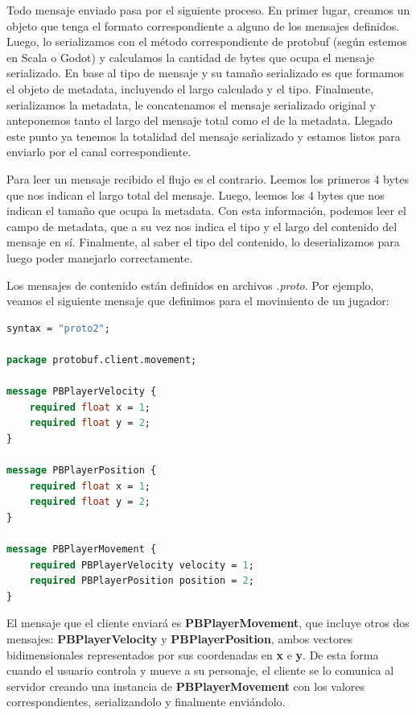 \newpage

Todo mensaje enviado pasa por el siguiente proceso. En primer lugar, creamos un objeto que tenga el formato correspondiente a alguno de los
mensajes definidos. Luego, lo serializamos con el método correspondiente de protobuf (según estemos en Scala o Godot) y
calculamos la cantidad de bytes que ocupa el mensaje serializado. En base al tipo de mensaje y su tamaño serializado es que formamos el objeto de metadata, incluyendo el largo calculado y el tipo.
Finalmente, serializamos la metadata, le concatenamos el mensaje serializado original y anteponemos tanto el largo del mensaje total como el de la metadata.
Llegado este punto ya tenemos la totalidad del mensaje serializado y estamos listos para enviarlo por el canal correspondiente.

Para leer un mensaje recibido el flujo es el contrario. Leemos los primeros 4 bytes que nos indican el largo
total del mensaje. Luego, leemos los 4 bytes que nos indican el tamaño que ocupa la metadata. Con esta información, podemos leer
el campo de metadata, que a su vez nos indica el tipo y el largo del contenido del mensaje en sí. Finalmente, al saber el tipo del contenido, lo
deserializamos para luego poder manejarlo correctamente.

Los mensajes de contenido están definidos en archivos \textit{.proto}. Por ejemplo, veamos el siguiente
mensaje que definimos para el movimiento de un jugador:

\begin{lstlisting}[language=protobuf]
syntax = "proto2";

package protobuf.client.movement;

message PBPlayerVelocity {
    required float x = 1;
    required float y = 2;
}

message PBPlayerPosition {
    required float x = 1;
    required float y = 2;
}

message PBPlayerMovement {
    required PBPlayerVelocity velocity = 1;
    required PBPlayerPosition position = 2;
}
\end{lstlisting}

El mensaje que el cliente enviará es \textbf{PBPlayerMovement}, que incluye otros dos mensajes:
\textbf{PBPlayerVelocity} y \textbf{PBPlayerPosition}, ambos vectores bidimensionales representados
por sus coordenadas en \textbf{x} e \textbf{y}. De esta forma cuando el usuario controla y mueve a
su personaje, el cliente se lo comunica al servidor creando una instancia de \textbf{PBPlayerMovement}
con los valores correspondientes, serializandolo y finalmente enviándolo.

